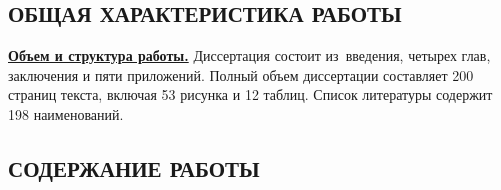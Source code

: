 \begin{center}
    \section*{ОБЩАЯ ХАРАКТЕРИСТИКА РАБОТЫ}
\end{center}

\newcommand{\actuality}{\pdfbookmark[1]{Актуальность}{actuality}\underline{\textbf{\actualityTXT}}}
\newcommand{\progress}{\pdfbookmark[1]{Разработанность темы}{progress}\underline{\textbf{\progressTXT}}}
\newcommand{\aim}{\pdfbookmark[1]{Цели}{aim}\underline{{\textbf\aimTXT}}}
\newcommand{\tasks}{\pdfbookmark[1]{Задачи}{tasks}\underline{\textbf{\tasksTXT}}}
\newcommand{\aimtasks}{\pdfbookmark[1]{Цели и задачи}{aimtasks}\aimtasksTXT}
\newcommand{\novelty}{\pdfbookmark[1]{Научная новизна}{novelty}\underline{\textbf{\noveltyTXT}}}
\newcommand{\influence}{\pdfbookmark[1]{Практическая значимость}{influence}\underline{\textbf{\influenceTXT}}}
\newcommand{\methods}{\pdfbookmark[1]{Методология и методы исследования}{methods}\underline{\textbf{\methodsTXT}}}
\newcommand{\defpositions}{\pdfbookmark[1]{Положения, выносимые на защиту}{defpositions}\underline{\textbf{\defpositionsTXT}}}
\newcommand{\reliability}{\pdfbookmark[1]{Достоверность}{reliability}\underline{\textbf{\reliabilityTXT}}}
\newcommand{\probation}{\pdfbookmark[1]{Апробация}{probation}\underline{\textbf{\probationTXT}}}
\newcommand{\contribution}{\pdfbookmark[1]{Личный вклад}{contribution}\underline{\textbf{\contributionTXT}}}
\newcommand{\publications}{\pdfbookmark[1]{Публикации}{publications}\underline{\textbf{\publicationsTXT}}}




\underline{\textbf{Объем и структура работы.}} Диссертация состоит из~введения,
четырех глав, заключения и пяти приложений. Полный объем диссертации
составляет 200 страниц текста, включая 53 рисунка и 12 таблиц. Список
литературы содержит 198 наименований.


\begin{center}
    \section*{СОДЕРЖАНИЕ РАБОТЫ}
\end{center}

